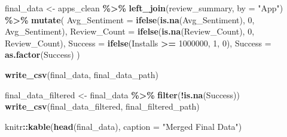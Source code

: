 \documentclass[
]{article}
\newenvironment{Shaded}{\begin{snugshade}}{\end{snugshade}}
\newcommand{\AttributeTok}[1]{\textcolor[rgb]{0.13,0.29,0.53}{#1}}
\newcommand{\DecValTok}[1]{\textcolor[rgb]{0.00,0.00,0.81}{#1}}
\newcommand{\FunctionTok}[1]{\textcolor[rgb]{0.13,0.29,0.53}{\textbf{#1}}}
\newcommand{\NormalTok}[1]{#1}
\newcommand{\OtherTok}[1]{\textcolor[rgb]{0.56,0.35,0.01}{#1}}
\newcommand{\SpecialCharTok}[1]{\textcolor[rgb]{0.81,0.36,0.00}{\textbf{#1}}}
\newcommand{\StringTok}[1]{\textcolor[rgb]{0.31,0.60,0.02}{#1}}
\begin{document}
\begin{Shaded}
\begin{Highlighting}[]
\NormalTok{final\_data }\OtherTok{\textless{}{-}}\NormalTok{ apps\_clean }\SpecialCharTok{\%\textgreater{}\%}
    \FunctionTok{left\_join}\NormalTok{(review\_summary, }\AttributeTok{by =} \StringTok{"App"}\NormalTok{) }\SpecialCharTok{\%\textgreater{}\%}
    \FunctionTok{mutate}\NormalTok{(}
        \AttributeTok{Avg\_Sentiment =} \FunctionTok{ifelse}\NormalTok{(}\FunctionTok{is.na}\NormalTok{(Avg\_Sentiment), }\DecValTok{0}\NormalTok{, Avg\_Sentiment),}
        \AttributeTok{Review\_Count =} \FunctionTok{ifelse}\NormalTok{(}\FunctionTok{is.na}\NormalTok{(Review\_Count), }\DecValTok{0}\NormalTok{, Review\_Count),}
        \AttributeTok{Success =} \FunctionTok{ifelse}\NormalTok{(Installs }\SpecialCharTok{\textgreater{}=} \DecValTok{1000000}\NormalTok{, }\DecValTok{1}\NormalTok{, }\DecValTok{0}\NormalTok{),}
        \AttributeTok{Success =} \FunctionTok{as.factor}\NormalTok{(Success)}
\NormalTok{    )}

\FunctionTok{write\_csv}\NormalTok{(final\_data, final\_data\_path)}

\NormalTok{final\_data\_filtered }\OtherTok{\textless{}{-}}\NormalTok{ final\_data }\SpecialCharTok{\%\textgreater{}\%} \FunctionTok{filter}\NormalTok{(}\SpecialCharTok{!}\FunctionTok{is.na}\NormalTok{(Success))}
\FunctionTok{write\_csv}\NormalTok{(final\_data\_filtered, final\_filtered\_path)}

\NormalTok{knitr}\SpecialCharTok{::}\FunctionTok{kable}\NormalTok{(}\FunctionTok{head}\NormalTok{(final\_data), }\AttributeTok{caption =} \StringTok{"Merged Final Data"}\NormalTok{)}
\end{Highlighting}
\end{Shaded}
\end{document}
